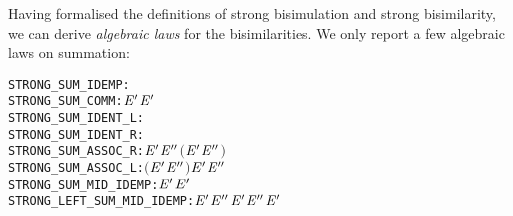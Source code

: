 Having formalised the definitions of strong bisimulation and strong bisimilarity,
we can derive \emph{algebraic laws} for the 
 bisimilarities. We only report a few algebraic laws on summation:
\begin{alltt}
STRONG_SUM_IDEMP:          \HOLTokenTurnstile{}  \HOLSymConst{\ensuremath{+}}  \HOLSymConst{\HOLTokenStrongEQ}   
STRONG_SUM_COMM:           \HOLTokenTurnstile{}  \HOLSymConst{\ensuremath{+}} \ensuremath{\HOLFreeVar{E}\sp{\prime}} \HOLSymConst{\HOLTokenStrongEQ} \ensuremath{\HOLFreeVar{E}\sp{\prime}} \HOLSymConst{\ensuremath{+}} 
STRONG_SUM_IDENT_L:        \HOLTokenTurnstile{}  \HOLSymConst{\ensuremath{+}}  \HOLSymConst{\HOLTokenStrongEQ} 
STRONG_SUM_IDENT_R:        \HOLTokenTurnstile{}  \HOLSymConst{\ensuremath{+}}  \HOLSymConst{\HOLTokenStrongEQ} 
STRONG_SUM_ASSOC_R:        \HOLTokenTurnstile{}  \HOLSymConst{\ensuremath{+}} \ensuremath{\HOLFreeVar{E}\sp{\prime}} \HOLSymConst{\ensuremath{+}} \ensuremath{\HOLFreeVar{E}\sp{\prime\prime}} \HOLSymConst{\HOLTokenStrongEQ}  \HOLSymConst{\ensuremath{+}} \ensuremath{(}\ensuremath{\HOLFreeVar{E}\sp{\prime}} \HOLSymConst{\ensuremath{+}} \ensuremath{\HOLFreeVar{E}\sp{\prime\prime}}\ensuremath{)}
STRONG_SUM_ASSOC_L:        \HOLTokenTurnstile{}  \HOLSymConst{\ensuremath{+}} \ensuremath{(}\ensuremath{\HOLFreeVar{E}\sp{\prime}} \HOLSymConst{\ensuremath{+}} \ensuremath{\HOLFreeVar{E}\sp{\prime\prime}}\ensuremath{)} \HOLSymConst{\HOLTokenStrongEQ}  \HOLSymConst{\ensuremath{+}} \ensuremath{\HOLFreeVar{E}\sp{\prime}} \HOLSymConst{\ensuremath{+}} \ensuremath{\HOLFreeVar{E}\sp{\prime\prime}}
STRONG_SUM_MID_IDEMP:      \HOLTokenTurnstile{}  \HOLSymConst{\ensuremath{+}} \ensuremath{\HOLFreeVar{E}\sp{\prime}} \HOLSymConst{\ensuremath{+}}  \HOLSymConst{\HOLTokenStrongEQ} \ensuremath{\HOLFreeVar{E}\sp{\prime}} \HOLSymConst{\ensuremath{+}} 
STRONG_LEFT_SUM_MID_IDEMP: \HOLTokenTurnstile{}  \HOLSymConst{\ensuremath{+}} \ensuremath{\HOLFreeVar{E}\sp{\prime}} \HOLSymConst{\ensuremath{+}} \ensuremath{\HOLFreeVar{E}\sp{\prime\prime}} \HOLSymConst{\ensuremath{+}} \ensuremath{\HOLFreeVar{E}\sp{\prime}} \HOLSymConst{\HOLTokenStrongEQ}  \HOLSymConst{\ensuremath{+}} \ensuremath{\HOLFreeVar{E}\sp{\prime\prime}} \HOLSymConst{\ensuremath{+}} \ensuremath{\HOLFreeVar{E}\sp{\prime}}
\end{alltt}

